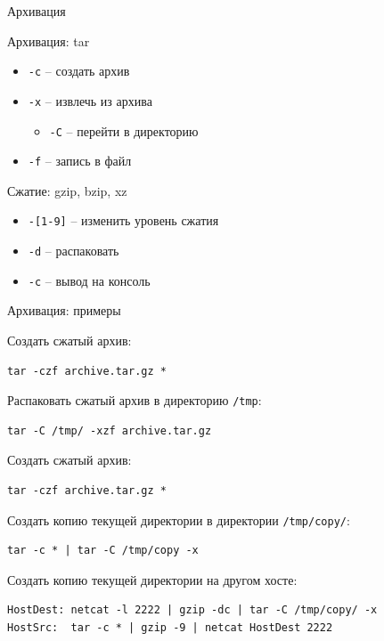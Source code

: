 \documentclass[ignorenonframetext, professionalfonts, hyperref={pdftex, unicode}]{beamer}
\begin{document}
\begin{frame}{Архивация}
	\begin{block}{Архивация: tar}
		\begin{itemize}
			\item {\tt -c} -- создать архив
			\item {\tt -x} -- извлечь из архива
				\begin{itemize}
					\item {\tt -C} -- перейти в директорию
				\end{itemize}
			\item {\tt -f} -- запись в файл
		\end{itemize}
	\end{block}

	\begin{block}{Сжатие: gzip, bzip, xz}
		\begin{itemize}
			\item {\tt -[1-9]} -- изменить уровень сжатия
			\item {\tt -d} -- распаковать
			\item {\tt -c} -- вывод на консоль
		\end{itemize}
	\end{block}
\end{frame}

\begin{frame}[fragile]{Архивация: примеры}

	Создать сжатый архив:
	\begin{verbatim}
tar -czf archive.tar.gz *
	\end{verbatim}
	\pause
	Распаковать сжатый архив в директорию {\tt /tmp}:
	\begin{verbatim}
tar -C /tmp/ -xzf archive.tar.gz 
	\end{verbatim}
	\pause
	Создать сжатый архив:
	\begin{verbatim}
tar -czf archive.tar.gz *
	\end{verbatim}
	\pause
	Создать копию текущей директории в директории {\tt /tmp/copy/}:
	\begin{verbatim}
tar -c * | tar -C /tmp/copy -x
	\end{verbatim}
	\pause
	Создать копию текущей директории на другом хосте:
	\begin{verbatim}
HostDest: netcat -l 2222 | gzip -dc | tar -C /tmp/copy/ -x
HostSrc:  tar -c * | gzip -9 | netcat HostDest 2222
	\end{verbatim}
\end{frame}
\end{document}
